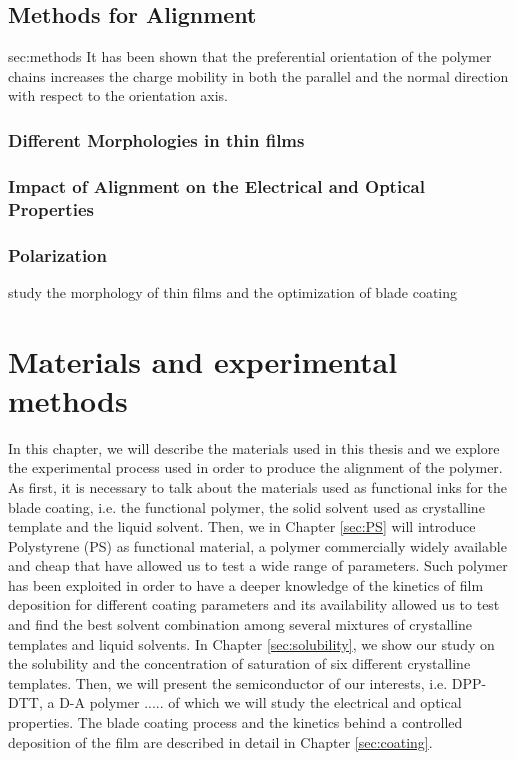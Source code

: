 \documentclass  [
  paper    = a4,
  BCOR     = 10mm,
  twoside,
  fontsize = 12pt,
  fleqn,
  toc      = bibnumbered,
  toc      = listofnumbered,
  numbers  = noendperiod,
  headings = normal,
  listof   = leveldown,
  version  = 3.03
]                                       {scrreprt}
\begin{document}
	\section{Methods for Alignment}{sec:methods}
	It has been shown that the preferential orientation of the polymer chains increases the charge mobility in both the parallel and the normal direction with respect to the orientation axis.
		\subsection{Different Morphologies in thin films}
		\subsection{Impact of Alignment on the Electrical and Optical Properties}
		\subsection{Polarization}
		
	study the morphology of thin films and the optimization of blade coating 
	
		
		
\chapter{Materials and experimental methods}\label{cha:experimental}

In this chapter, we will describe the materials used in this thesis and we explore the experimental process used in order to produce the alignment of the polymer. As first, it is necessary to talk about the materials used as functional inks for the blade coating, i.e. the functional polymer, the solid solvent used as crystalline template and the liquid solvent.
Then, we in Chapter \ref{sec:PS} will introduce Polystyrene (PS) as functional material, a polymer commercially widely available and cheap that have allowed us to test a wide range of parameters. Such polymer has been exploited in order to have a deeper knowledge of the kinetics of film deposition for different coating parameters and its availability allowed us to test and find the best solvent combination among several mixtures of crystalline templates and liquid solvents. In Chapter \ref{sec:solubility}, we show our study on the solubility and the concentration of saturation of six different crystalline templates. Then, we will present the semiconductor of our interests, i.e. DPP-DTT, a D-A polymer .....%
of which we will study the electrical and optical properties. The blade coating process and the kinetics behind a controlled deposition of the film are described in detail in Chapter \ref{sec:coating}.\\ 
\end{document}
